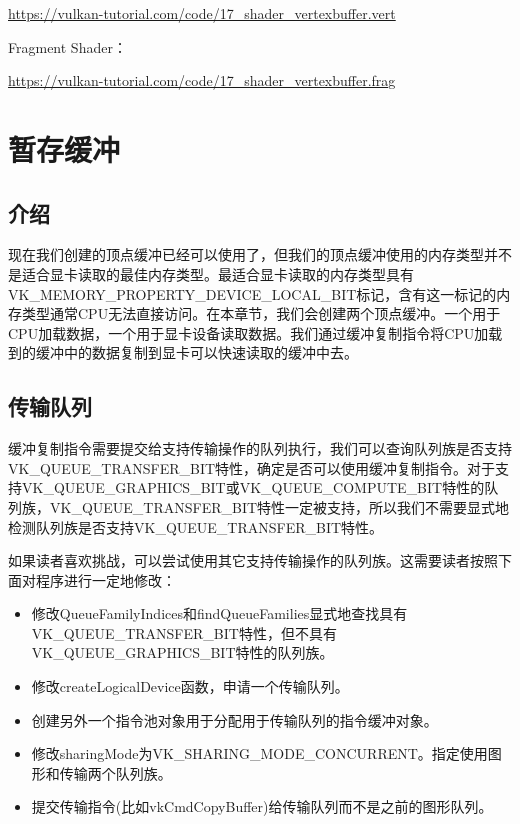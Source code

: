 \documentclass{ctexart}
\begin{document}
\url{https://vulkan-tutorial.com/code/17_shader_vertexbuffer.vert}

Fragment Shader：

\url{https://vulkan-tutorial.com/code/17_shader_vertexbuffer.frag}

\newpage
\section{暂存缓冲}

\subsection{介绍}

现在我们创建的顶点缓冲已经可以使用了，但我们的顶点缓冲使用的内存类型并不是适合显卡读取的最佳内存类型。最适合显卡读取的内存类型具有VK\_MEMORY\_PROPERTY\_DEVICE\_LOCAL\_BIT标记，含有这一标记的内存类型通常CPU无法直接访问。在本章节，我们会创建两个顶点缓冲。一个用于CPU加载数据，一个用于显卡设备读取数据。我们通过缓冲复制指令将CPU加载到的缓冲中的数据复制到显卡可以快速读取的缓冲中去。

\subsection{传输队列}

缓冲复制指令需要提交给支持传输操作的队列执行，我们可以查询队列族是否支持VK\_QUEUE\_TRANSFER\_BIT特性，确定是否可以使用缓冲复制指令。对于支持VK\_QUEUE\_GRAPHICS\_BIT或VK\_QUEUE\_COMPUTE\_BIT特性的队列族，VK\_QUEUE\_TRANSFER\_BIT特性一定被支持，所以我们不需要显式地检测队列族是否支持VK\_QUEUE\_TRANSFER\_BIT特性。

如果读者喜欢挑战，可以尝试使用其它支持传输操作的队列族。这需要读者按照下面对程序进行一定地修改：

\begin{itemize}
	\item 修改QueueFamilyIndices和findQueueFamilies显式地查找具有VK\_QUEUE\_TRANSFER\_BIT特性，但不具有VK\_QUEUE\_GRAPHICS\_BIT特性的队列族。
	\item 修改createLogicalDevice函数，申请一个传输队列。
	\item 创建另外一个指令池对象用于分配用于传输队列的指令缓冲对象。
	\item 修改sharingMode为VK\_SHARING\_MODE\_CONCURRENT。指定使用图形和传输两个队列族。
	\item 提交传输指令(比如vkCmdCopyBuffer)给传输队列而不是之前的图形队列。
\end{itemize}
\end{document}

